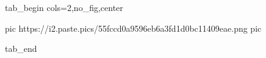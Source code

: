  
 
 
 
 


\ifcmt
  tab_begin cols=2,no_fig,center

     pic https://i2.paste.pics/55fccd0a9596eb6a3fd1d0bc11409eae.png
		 pic 

  tab_end
\fi

